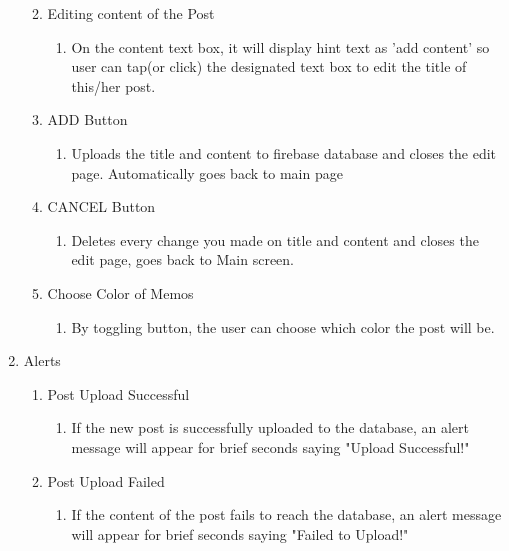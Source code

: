 \documentclass[conference]{IEEEtran}
\numberwithin{figure}{subsection}
\begin{document}
\begin{enumerate}
\begin{enumerate}
\begin{enumerate}
            \end{enumerate}
        \item Editing content of the Post
            \begin{enumerate}
                \item On the content text box, it will display hint text as 'add content' so user can tap(or click) the designated text box to edit the title of this/her post.
            \end{enumerate}
        \item ADD Button
            \begin{enumerate}
                \item Uploads the title and content to firebase database and closes the edit page. Automatically goes back to main page
            \end{enumerate}
        \item CANCEL Button
            \begin{enumerate}
                \item Deletes every change you made on title and content and closes the edit page, goes back to Main screen.
            \end{enumerate}
        \item Choose Color of Memos
            \begin{enumerate}
                \item By toggling button, the user can choose which color the post will be.
            \end{enumerate}
    \end{enumerate}
    \item Alerts
        \begin{enumerate}
            \item Post Upload Successful
                \begin{enumerate}
                    \item If the new post is successfully uploaded to the database, an alert message will appear for brief seconds saying "Upload Successful!"
                \end{enumerate}
            \item Post Upload Failed
                \begin{enumerate}
                    \item If the content of the post fails to reach the database, an alert message will appear for brief seconds saying "Failed to Upload!"
                \end{enumerate}

\end{enumerate}
\end{enumerate}
\end{document}
